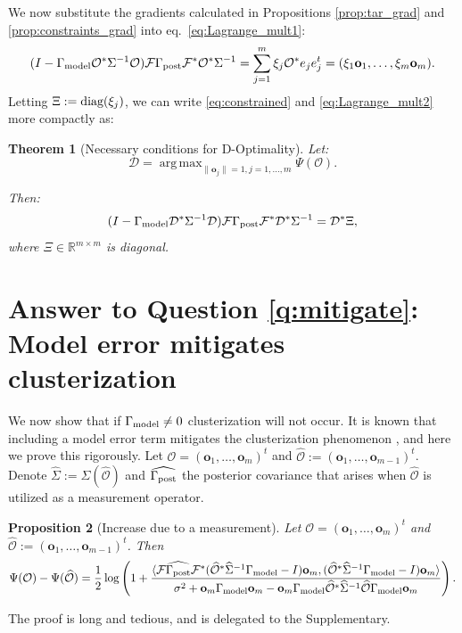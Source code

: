 \documentclass[ba]{imsart}
\newcommand{\diag}{\textup{diag}}
\newcommand{\obs}{\mathcal{O}}
\newcommand{\fwd}{\mathcal{F}}
\newcommand{\obsm}{\widehat{\obs}}
\newcommand{\Sigmam}{\widehat{\Sigma}}
\newcommand{\postcovm}{\widehat{\Gamma_{\textup{post}}}}
\newcommand{\tar}{\Psi}
\DeclareMathOperator*{\argmax}{arg\,max}
\newcommand{\meas}{\mathbf{o}}
\newcommand{\opt}{\mathcal{D}}
\theoremstyle{plain}
\newtheorem{theorem}{Theorem}
\newtheorem{proposition}[theorem]{Proposition}
\theoremstyle{definition}
\theoremstyle{remark}
\begin{document}
We now substitute the gradients calculated in Propositions
\ref{prop:tar_grad} and \ref{prop:constraints_grad} into
eq.~\eqref{eq:Lagrange_mult1}:
\begin{equation}\label{eq:constrained}
  (I - \modcov \obs^* \Sigma^{-1} \obs) \fwd \postcov \fwd^* \obs^*\Sigma^{-1}
  = \sum_{j=1}^m \xi_j \obs^* e_je_j^t = (\xi_1 \meas_1,\dots,\xi_m \meas_m).
\end{equation} 
Letting $\Xi := \diag(\xi_j)$, we can write \eqref{eq:constrained} and
\eqref{eq:Lagrange_mult2} more compactly as:

\begin{theorem}[Necessary conditions for D-Optimality]\label{thm:constrained}
  Let:
  \begin{equation*}
    \opt = \argmax_{\|\meas_j\| = 1, j=1,\dots,m}\tar(\obs).
  \end{equation*}
  
  Then:
  \begin{equation*}
    ( I - \modcov \opt^* \Sigma^{-1} \opt) \fwd \postcov \fwd^* \opt^*  \Sigma^{-1}
    = \opt^* \Xi, 
  \end{equation*}
  where $\Xi \in \mathbb{R}^{m \times m}$ is diagonal.
\end{theorem}




 \section{Answer to Question \ref{q:mitigate}: Model error mitigates clusterization}\label{section:non_vanishing}
We now show that if $\Gamma_{\textup{model}} \neq 0$ clusterization will not occur. It
is known that including a model error term mitigates the
clusterization phenomenon \cite{Ucinski05}, and here we prove this
rigorously. Let $\obs = (\meas_1,\dots,\meas_m)^t$ and $\obsm :=
(\meas_1,\dots,\meas_{m-1})^t$. Denote $\Sigmam := \Sigma (\obsm)$ and
$\postcovm$ the posterior covariance that arises when $\obsm$ is
utilized as a measurement operator.

\begin{proposition}[Increase due to a measurement]\label{prop:design_increase}
  Let $\obs = (\meas_1,\dots,\meas_m)^t$ and $\obsm :=
  (\meas_1,\dots,\meas_{m-1})^t$. Then
  \begin{equation}\label{eq:conclusion}
    \tar( \obs ) - \tar (\obsm ) =
    \frac12 \log \left ( 1 + \frac{
      \langle \fwd \postcovm \fwd^* (\obsm^* \Sigmam^{-1} \modcov - I ) \meas_m,
      (\obsm^* \Sigmam^{-1} \modcov - I ) \meas_m \rangle
    }{
      \sigma^2 + \meas_m \modcov \meas_m - \meas_m \modcov \obsm^* \Sigmam^{-1} \obsm \modcov \meas_m 
    }       
    \right ).
  \end{equation}
\end{proposition}
The proof is long and tedious, and is delegated to the Supplementary.
\end{document}
